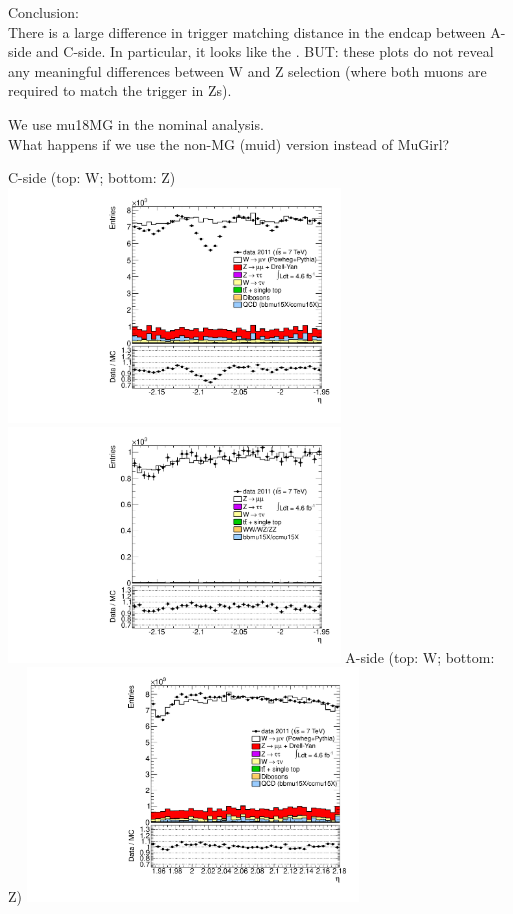  {
  Conclusion: \\
  There is a large difference in trigger matching distance in the endcap between A-side and C-side. In particular, it looks like the . BUT: these plots do not reveal any meaningful differences between W and Z selection (where both muons are required to match the trigger in Zs).
}

 {
 We use mu18MG in the nominal analysis. \\
 What happens if we use the non-MG (muid) version instead of MuGirl?
}

 {
\colb[T]
C-side (top: W; bottom: Z)
\centering
\includegraphics[width=0.66\textwidth]{dates/20130306/figures/mu18/WMU18_MG_10_C_stack_l_eta_NEG} \\
\includegraphics[width=0.66\textwidth]{dates/20130306/figures/mu18/ZMU18_MG_10_C_stack_lN_eta_ALL.pdf}
A-side (top: W; bottom: Z)
\centering
\includegraphics[width=0.66\textwidth]{dates/20130306/figures/mu18/WMU18_MG_10_A_stack_l_eta_NEG} \\
}
